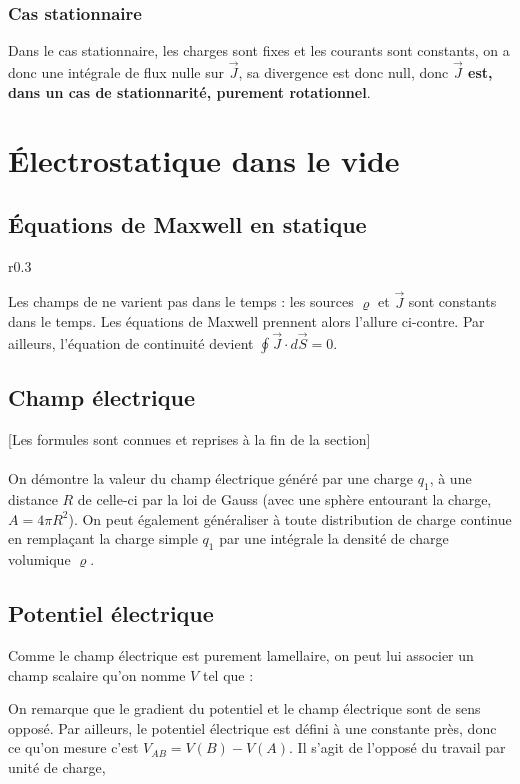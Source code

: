 \documentclass[12pt]{book}
\begin{document}
\subsection*{Cas stationnaire}
Dans le cas stationnaire, les charges sont fixes et les courants sont constants, on a donc une intégrale de flux nulle sur $\vec{J}$, sa divergence est donc null, donc \textbf{$\vec{J}$ est, dans un cas de stationnarité, purement rotationnel}.
\chapter{Électrostatique dans le vide}
\section{Équations de Maxwell en statique}
\begin{wrapfigure}[8]{r}{0.3\textwidth} 
  \vspace{-1cm} \Large \maxwellvide
  \end{wrapfigure}
Les champs de ne varient pas dans le temps : les sources $\varrho$ et $\vec{J}$ sont constants dans le temps. Les équations de Maxwell prennent alors l'allure ci-contre. Par ailleurs, l'équation de continuité devient $\oint \vec{J}\cdot d\vec{S} = 0$.
\section{Champ électrique}
[Les formules sont connues et reprises à la fin de la section] \\ \\
On démontre la valeur du champ électrique généré par une charge $q_1$, à une distance $R$ de celle-ci par la loi de Gauss (avec une sphère entourant la charge, $A = 4\pi R^2$). On peut également généraliser à toute distribution de charge continue en remplaçant la charge simple $q_1$ par une intégrale la densité de charge volumique $\varrho$.
\section{Potentiel électrique}
Comme le champ électrique est purement lamellaire, on peut lui associer un champ scalaire qu'on nomme  $V$ tel que :


On remarque que le gradient du potentiel et le champ électrique sont de sens opposé. Par ailleurs, le potentiel électrique est défini à une constante près, donc ce qu'on mesure c'est $V_{AB} = V(B)-V(A)$. Il s'agit de l'opposé du travail par unité de charge,
\end{document}
